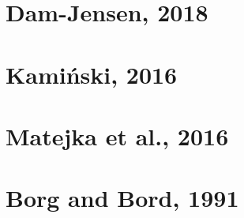 \section{Dam-Jensen, 2018}
\cite{dam}

\section{Kami\'nski, 2016}
\cite{tomas}


\section{Matejka et al., 2016}
\cite{grey}

\section{Borg and Bord, 1991}
\cite{borg}